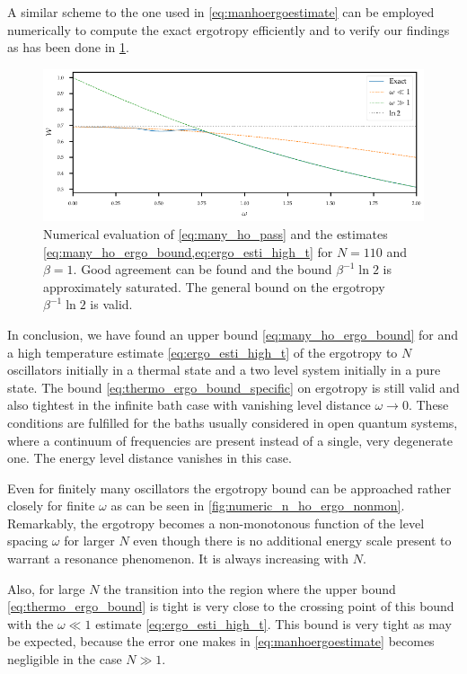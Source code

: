 A similar scheme to the one used in \cref{eq:manhoergoestimate} can be
employed numerically to compute the exact ergotropy efficiently and to verify our
findings as has been done in \cref{fig:numeric_n_ho_ergo}.
\begin{figure}[htp]
  \includegraphics{figs/ergo_calc/ergo_numeric}
  \caption{\label{fig:numeric_n_ho_ergo} Numerical evaluation of
    \cref{eq:many_ho_pass} and the estimates
    \cref{eq:many_ho_ergo_bound,eq:ergo_esti_high_t} for \(N=110\) and
    \(β=1\). Good agreement can be found and the bound \(β^{-1}\ln2\)
    is approximately saturated. The general bound on the ergotropy
    \(β^{-1}\ln2\) is valid.}
\end{figure}

In conclusion, we have found an upper bound
\cref{eq:many_ho_ergo_bound} for and a high temperature estimate
\cref{eq:ergo_esti_high_t} of the ergotropy to \(N\) oscillators
initially in a thermal state and a two level system initially in a
pure state. The bound \cref{eq:thermo_ergo_bound_specific} on
ergotropy is still valid and also tightest in the infinite bath case
with vanishing level distance \(ω\to 0\). These conditions are
fulfilled for the baths usually considered in open quantum systems,
where a continuum of frequencies are present instead of a single, very
degenerate one. The energy level distance vanishes in this case.

Even for finitely many oscillators the ergotropy bound can be
approached rather closely for finite \(ω\) as can be seen in
\cref{fig:numeric_n_ho_ergo_nonmon}. Remarkably, the ergotropy becomes
a non-monotonous function of the level spacing \(ω\) for larger \(N\)
even though there is no additional energy scale present to warrant a
resonance phenomenon.  It is always increasing with \(N\).

Also, for large \(N\) the transition into the region where the upper
bound \cref{eq:thermo_ergo_bound} is tight is very close to the
crossing point of this bound with the \(ω\ll 1\) estimate
\cref{eq:ergo_esti_high_t}. This bound is very tight as may be
expected, because the error one makes in \cref{eq:manhoergoestimate}
becomes negligible in the case \(N\gg 1\).

